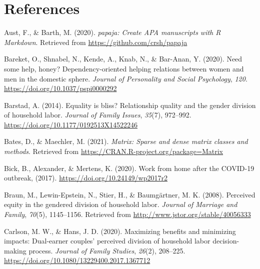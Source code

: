 \documentclass[
  man]{apa6}
\newlength{\cslhangindent}
\newlength{\cslentryspacingunit} %
\newenvironment{CSLReferences}[2] %
 {%
  \setlength{\parindent}{0pt}
  \ifodd #1
  \let\oldpar\par
  \def\par{\hangindent=\cslhangindent\oldpar}
  \fi
  \setlength{\parskip}{#2\cslentryspacingunit}
 }%
 {}
\begin{document}
\newpage

\hypertarget{references}{%
\section{References}\label{references}}

\begingroup
\setlength{\parindent}{-0.5in}
\setlength{\leftskip}{0.5in}

\hypertarget{refs}{}
\begin{CSLReferences}{1}{0}
\leavevmode{}%
Aust, F., \& Barth, M. (2020). \emph{{papaja}: {Create} {APA} manuscripts with {R Markdown}}. Retrieved from \url{https://github.com/crsh/papaja}

\leavevmode{}%
Bareket, O., Shnabel, N., Kende, A., Knab, N., \& Bar-Anan, Y. (2020). Need some help, honey? Dependency-oriented helping relations between women and men in the domestic sphere. \emph{Journal of Personality and Social Psychology}, \emph{120}. \url{https://doi.org/10.1037/pspi0000292}

\leavevmode{}%
Barstad, A. (2014). Equality is bliss? Relationship quality and the gender division of household labor. \emph{Journal of Family Issues}, \emph{35}(7), 972--992. \url{https://doi.org/10.1177/0192513X14522246}

\leavevmode{}%
Bates, D., \& Maechler, M. (2021). \emph{Matrix: Sparse and dense matrix classes and methods}. Retrieved from \url{https://CRAN.R-project.org/package=Matrix}

\leavevmode{}%
Bick, B., Alexander, \& Mertens, K. (2020). Work from home after the COVID-19 outbreak, (2017). \url{https://doi.org/10.24149/wp2017r2}

\leavevmode{}%
Braun, M., Lewin-Epstein, N., Stier, H., \& Baumgärtner, M. K. (2008). Perceived equity in the gendered division of household labor. \emph{Journal of Marriage and Family}, \emph{70}(5), 1145--1156. Retrieved from \url{http://www.jstor.org/stable/40056333}

\leavevmode{}%
Carlson, M. W., \& Hans, J. D. (2020). Maximizing benefits and minimizing impacts: Dual-earner couples' perceived division of household labor decision-making process. \emph{Journal of Family Studies}, \emph{26}(2), 208--225. \url{https://doi.org/10.1080/13229400.2017.1367712}


\end{CSLReferences}
\end{document}
